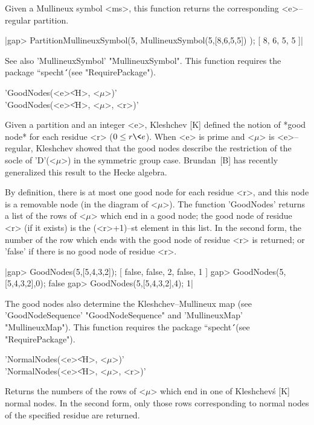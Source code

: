Given a Mullineux symbol <ms>, this function returns the corresponding
<e>--regular partition.

|gap> PartitionMullineuxSymbol(5, MullineuxSymbol(5,[8,6,5,5]) );
[ 8, 6, 5, 5 ]|

See also 'MullineuxSymbol' "MullineuxSymbol". This function 
requires the package ``specht\'\'\ (see "RequirePackage").



'GoodNodes(<e>\|<H>, <$\mu$>)'\\
'GoodNodes(<e>\|<H>, <$\mu$>, <r>)'

Given a partition and an integer <e>, Kleshchev [K] defined the notion of 
*good node* for each residue <r> ($0\le r\<e$). When <e> is prime and 
<$\mu$> is <e>--regular, Kleshchev showed that the good nodes describe the 
restriction of the socle of 'D'(<$\mu$>) in the symmetric group case. 
Brundan~[B] has recently generalized this result to the Hecke algebra.

By definition, there is at most one good node for each residue <r>, and 
this node is a removable node (in the diagram of <$\mu$>). The function 
'GoodNodes' returns a list of the rows of <$\mu$> which end in a good 
node; the good node of residue <r> (if it exists) is the (<r>+1)--st 
element in this list. In the second form, the number of the row which 
ends with the good node of residue <r> is returned; or 'false' if there 
is no good node of residue <r>.

|gap> GoodNodes(5,[5,4,3,2]);
[ false, false, 2, false, 1 ]
gap> GoodNodes(5,[5,4,3,2],0);
false
gap> GoodNodes(5,[5,4,3,2],4);
1|

The good nodes also determine the Kleshchev--Mullineux map (see 
'GoodNodeSequence' "GoodNodeSequence" and 'MullineuxMap' "MullineuxMap"). This 
function requires the package ``specht\'\'\ (see "RequirePackage").



'NormalNodes(<e>\|<H>, <$\mu$>)'\\
'NormalNodes(<e>\|<H>, <$\mu$>, <r>)'

Returns the numbers of the rows of <$\mu$> which end in one of 
Kleshchev\'s [K] normal nodes. In the second form, only those rows
corresponding to normal nodes of the specified residue are returned.

